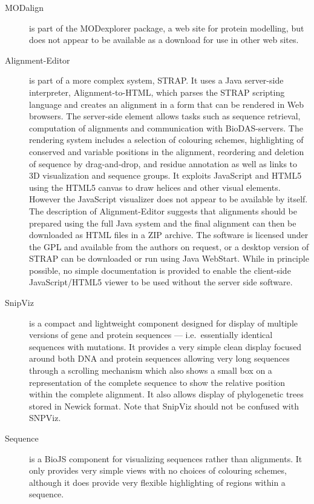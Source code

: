 \documentclass[12pt]{article}
\begin{document}
\begin{description}
\item[MODalign] is part of the MODexplorer
  package\cite{kosinski:2013}, a web site for protein modelling, but
  does not appear to be available as a download for use in other web
  sites.
\item[Alignment-Editor] is part of a more complex system, STRAP. It
  uses a Java server-side interpreter,
  Alignment-to-HTML\cite{gille:2014}, which parses the STRAP scripting
  language and creates an alignment in a form that can be rendered in
  Web browsers. The server-side element allows tasks such as sequence
  retrieval, computation of alignments and communication with
  BioDAS-servers. The rendering system includes a selection of
  colouring schemes, highlighting of conserved and variable positions
  in the alignment, reordering and deletion of sequence by
  drag-and-drop, and residue annotation as well as links to 3D
  visualization and sequence groups. It exploits JavaScript and HTML5
  using the HTML5 canvas to draw helices and other visual elements.
  However the JavaScript visualizer does not appear to be available by
  itself. The description of Alignment-Editor\cite{gille:2014aa}
  suggests that alignments should be prepared using the full Java
  system and the final alignment can then be downloaded as HTML files
  in a ZIP archive. The software is licensed under the GPL and
  available from the authors on request, or a desktop version of STRAP
  can be downloaded or run using Java WebStart. While in principle
  possible, no simple documentation is provided to enable the
  client-side JavaScript/HTML5 viewer to be used without the server
  side software.
\item[SnipViz] is a compact and lightweight component designed for
  display of multiple versions of gene and protein sequences --- i.e.\
  essentially identical sequences with mutations.  It provides a very
  simple clean display focused around both DNA and protein sequences
  allowing very long sequences through a scrolling mechanism which
  also shows a small box on a representation of the complete sequence
  to show the relative position within the complete alignment.  It
  also allows display of phylogenetic trees stored in Newick
  format. Note that SnipViz should not be confused with
  SNPViz\cite{langewisch:snpviz}.
\item[Sequence] is a BioJS component for visualizing sequences rather
  than alignments.  It only provides very simple views with no choices
  of colouring schemes, although it does provide very flexible
  highlighting of regions within a sequence.
\end{description}
\end{document}
